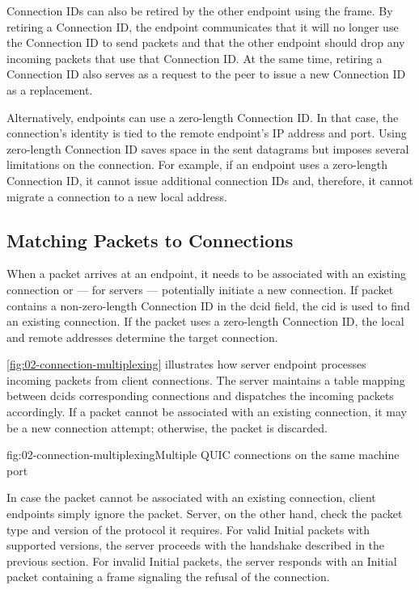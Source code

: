 Connection IDs can also be retired by the other endpoint using the \RETIRECONNECTIONID{} frame. By
retiring a Connection ID, the endpoint communicates that it will no longer use the Connection ID to
send packets and that the other endpoint should drop any incoming packets that use that Connection
ID\@. At the same time, retiring a Connection ID also serves as a request to the peer to issue a new
Connection ID as a replacement.

Alternatively, endpoints can use a zero-length Connection ID\@. In that case, the connection's
identity is tied to the remote endpoint's IP address and port. Using zero-length Connection ID saves
space in the sent datagrams but imposes several limitations on the connection. For example, if an
endpoint uses a zero-length Connection ID, it cannot issue additional connection IDs and, therefore,
it cannot migrate a connection to a new local address.

\subsection{Matching Packets to Connections}

When a packet arrives at an endpoint, it needs to be associated with an existing connection or ---
for servers --- potentially initiate a new connection. If packet contains a non-zero-length
Connection ID in the \gls{dcid} field, the \gls{cid} is used to find an existing connection. If the
packet uses a zero-length Connection ID, the local and remote addresses determine the target
connection.

\autoref{fig:02-connection-multiplexing} illustrates how server endpoint processes incoming packets
from client connections. The server maintains a table mapping between \gls{dcid}s corresponding
connections and dispatches the incoming packets accordingly. If a packet cannot be associated with
an existing connection, it may be a new connection attempt; otherwise, the packet is discarded.

\begin{myFigure}{fig:02-connection-multiplexing}{Multiple QUIC connections on the same machine port}



\end{myFigure}

In case the packet cannot be associated with an existing connection, client endpoints simply ignore
the packet. Server, on the other hand, check the packet type and version of the protocol it
requires. For valid Initial packets with supported versions, the server proceeds with the handshake
described in the previous section. For invalid Initial packets, the server responds with an Initial
packet containing a \CONNECTIONCLOSE{} frame signaling the refusal of the connection.

